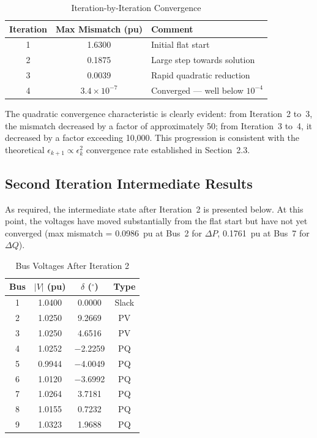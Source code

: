 \documentclass[12pt, a4paper]{article}
\begin{document}
\begin{table}[htbp]
\centering
\caption{Iteration-by-Iteration Convergence}
\label{tab:conv_history}
\begin{tabular}{c c l}
\toprule
\textbf{Iteration} & \textbf{Max Mismatch (pu)} & \textbf{Comment} \\
\midrule
1 & 1.6300 & Initial flat start \\
2 & 0.1875 & Large step towards solution \\
3 & 0.0039 & Rapid quadratic reduction \\
4 & $3.4 \times 10^{-7}$ & Converged --- well below $10^{-4}$ \\
\bottomrule
\end{tabular}
\end{table}

The quadratic convergence characteristic is clearly evident: from Iteration~2 to~3, the mismatch decreased by a factor of approximately 50; from Iteration~3 to~4, it decreased by a factor exceeding 10,000. This progression is consistent with the theoretical $\epsilon_{k+1} \propto \epsilon_k^2$ convergence rate established in Section~2.3.

\subsection{Second Iteration Intermediate Results}
As required, the intermediate state after Iteration~2 is presented below. At this point, the voltages have moved substantially from the flat start but have not yet converged (max mismatch = 0.0986~pu at Bus~2 for $\Delta P$, 0.1761~pu at Bus~7 for $\Delta Q$).

\begin{table}[htbp]
\centering
\caption{Bus Voltages After Iteration 2}
\label{tab:iter2_results}
\begin{tabular}{c c c c}
\toprule
\textbf{Bus} & \textbf{$|V|$ (pu)} & \textbf{$\delta$ ($^{\circ}$)} & \textbf{Type} \\
\midrule
1 & 1.0400 & 0.0000 & Slack \\
2 & 1.0250 & 9.2669 & PV \\
3 & 1.0250 & 4.6516 & PV \\
4 & 1.0252 & $-$2.2259 & PQ \\
5 & 0.9944 & $-$4.0049 & PQ \\
6 & 1.0120 & $-$3.6992 & PQ \\
7 & 1.0264 & 3.7181 & PQ \\
8 & 1.0155 & 0.7232 & PQ \\
9 & 1.0323 & 1.9688 & PQ \\
\bottomrule
\end{tabular}
\end{table}
\end{document}
